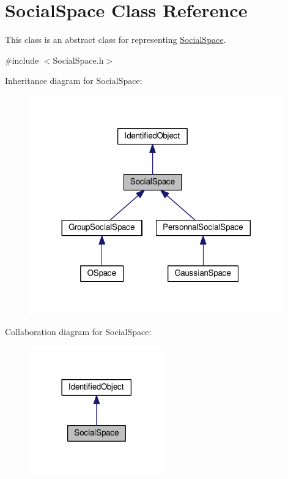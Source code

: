 \hypertarget{classSocialSpace}{}\section{Social\+Space Class Reference}
\label{classSocialSpace}


This class is an abstract class for representing \hyperlink{classSocialSpace}{Social\+Space}.  




{\ttfamily \#include $<$Social\+Space.\+h$>$}



Inheritance diagram for Social\+Space\+:\nopagebreak
\begin{figure}[H]
\begin{center}
\leavevmode
\includegraphics[width=311pt]{classSocialSpace__inherit__graph}
\end{center}
\end{figure}


Collaboration diagram for Social\+Space\+:\nopagebreak
\begin{figure}[H]
\begin{center}
\leavevmode
\includegraphics[width=165pt]{classSocialSpace__coll__graph}
\end{center}
\end{figure}

